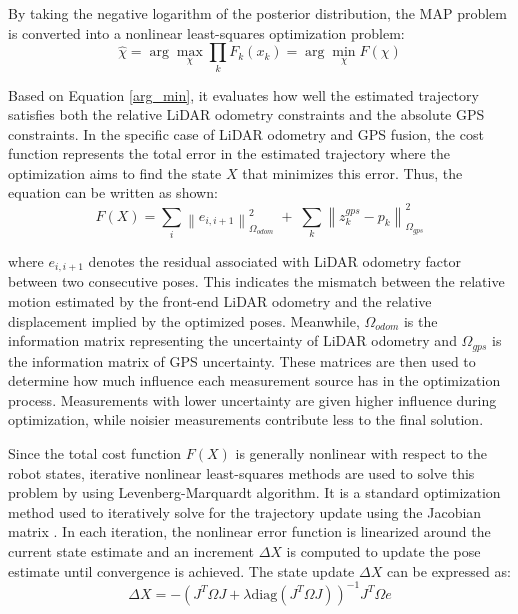 \documentclass[12pt, a4paper]{article}
\begin{document}
By taking the negative logarithm of the posterior distribution, the MAP problem is converted into a nonlinear least-squares optimization problem:
\begin{equation} \label{arg_min}
    \hat{\chi} = \arg\max_{\chi} \prod_{k} F_k(x_k) = \arg\min_{\chi} F(\chi)
\end{equation}

Based on Equation \eqref{arg_min}, it evaluates how well the estimated trajectory satisfies both the relative LiDAR odometry constraints and the absolute GPS constraints. In the specific case of LiDAR odometry and GPS fusion, the cost function represents the total error in the estimated trajectory where the optimization aims to find the state $X$ that minimizes this error. Thus, the equation can be written as shown:
\begin{equation} \label{eq:error_score}
F(X)=\sum_i \left\| e_{i,i+1} \right\|^2_{\Omega_{odom}}
\;+\;
\sum_k \left\| z_k^{gps} - p_k \right\|^2_{\Omega_{gps}}
\end{equation}

where $e_{i,i+1}$ denotes the residual associated with LiDAR odometry factor between two consecutive poses. This indicates the mismatch between the relative motion estimated by the front-end LiDAR odometry and the relative displacement implied by the optimized poses. Meanwhile, $\Omega_{odom}$ is the information matrix representing the uncertainty of LiDAR odometry and $\Omega_{gps}$ is the information matrix of GPS uncertainty. These matrices are then used to determine how much influence each measurement source has in the optimization process. Measurements with lower uncertainty are given higher influence during optimization, while noisier measurements contribute less to the final solution. 

Since the total cost function $F(X)$ is generally nonlinear with respect to the robot states, iterative nonlinear least-squares methods are used to solve this problem by using Levenberg-Marquardt algorithm. It is a standard optimization method used to iteratively solve for the trajectory update using the Jacobian matrix \cite{ranganathan2004levenberg}. In each iteration, the nonlinear error function is linearized around the current state estimate and an increment $\Delta X$ is computed to update the pose estimate until convergence is achieved. The state update $\Delta X$ can be expressed as:
\begin{equation}
\Delta X = -(J^T \Omega J + \lambda \text{diag}(J^T \Omega J))^{-1} J^T \Omega e
\end{equation}
\end{document}
